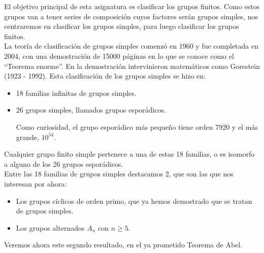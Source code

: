 \noindent
El objetivo principal de esta asignatura es clasificar los grupos finitos. Como estos grupos van a tener series de composición cuyos factores serán grupos simples, nos centraremos en clasificar los grupos simples, para luego clasificar los grupos finitos.\\

\noindent
La teoría de clasificación de grupos simples comenzó en 1960 y fue completada en 2004, con una demostración de 15000 páginas en lo que se conoce como el ``Teorema enorme''. En la demostración intervinieron matemáticos como Gorestein (1923 - 1992). Esta clasificación de los grupos simples se hizo en:
\begin{itemize}
    \item 18 familias infinitas de grupos simples.
    \item 26 grupos simples, llamados grupos esporádicos. 

        Como curiosidad, el grupo esporádico más pequeño tiene orden 7920 y el más grande, $10^{54}$.
\end{itemize}
Cualquier grupo finito simple pertenece a una de estas 18 familias, o es isomorfo a alguno de los 26 grupos esporádicos.\\

\noindent
Entre las 18 familias de grupos simples destacamos 2, que son las que nos interesan por ahora: 
\begin{itemize}
    \item Los grupos cíclicos de orden primo, que ya hemos demostrado que se tratan de grupos simples.
    \item Los grupos alternados $A_n$ con $n\geq 5$.
\end{itemize}
Veremos ahora este segundo resultado, en el ya prometido Teorema de Abel.


